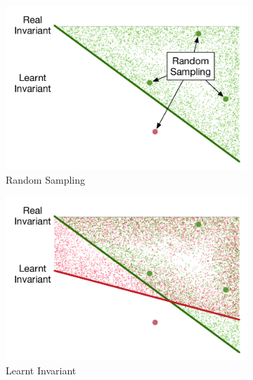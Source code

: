 \begin{figure}[!h]
    \centering
    \begin{subfigure}{0.23\textwidth}
        \centering
        \includegraphics[scale=0.3]{figures/general-sampling-0.pdf}
        \caption{Random Sampling}
        \label{fig:sampling:random}
    \end{subfigure}
    \begin{subfigure}{0.23\textwidth}
        \centering
        \includegraphics[scale=0.3]{figures/general-sampling-1.pdf}
        \caption{Learnt Invariant}
        \label{fig:sampling:random:invariant}
    \end{subfigure}
    \begin{subfigure}{0.23\textwidth}
        \centering

\end{subfigure}
\end{figure}
